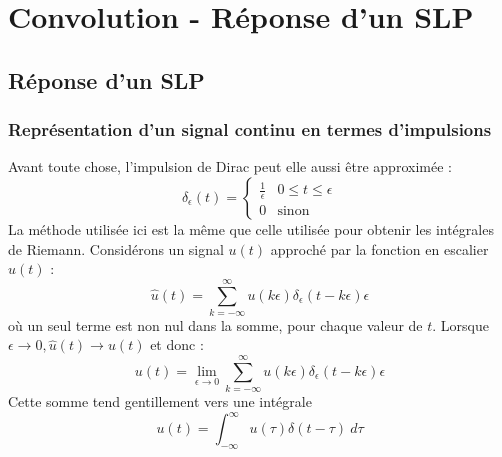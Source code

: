 \chapter{Convolution - Réponse d'un SLP}
\section{Réponse d'un SLP}
\subsection{Représentation d'un signal continu en termes d'impulsions}
Avant toute chose, l'impulsion de Dirac peut elle aussi \^etre approximée :
\begin{equation}
	\delta_\epsilon(t) = \left\{\begin{array}{ll}
	\frac{1}{\epsilon} & 0\leq t \leq \epsilon\\
	0 & \text{sinon}
	\end{array}\right.
\end{equation}
La méthode utilisée ici est la m\^eme que celle utilisée pour obtenir les 
intégrales de Riemann. Considérons un signal $u(t)$ approché par la 
fonction en escalier $\hat{u}(t)$ :
\begin{equation}
	\hat{u}(t) = \sum_{k=-\infty}^\infty u(k\epsilon)\delta_\epsilon(t-k\epsilon)\epsilon
\end{equation}
où un seul terme est non nul dans la somme, pour chaque valeur de $t$. 
Lorsque $\epsilon\rightarrow 0, \hat{u}(t) \rightarrow u(t)$ et donc :
\begin{equation}
	u(t) = \lim\limits_{\epsilon\rightarrow 0} \sum_{k=-\infty}^\infty u(k
	\epsilon)\delta_\epsilon(t-k\epsilon)\epsilon
\end{equation}
Cette somme tend gentillement vers une intégrale 
\begin{equation}
	u(t) = \int_{-\infty}^\infty u(\tau)\delta(t-\tau)\ d\tau
\end{equation}


